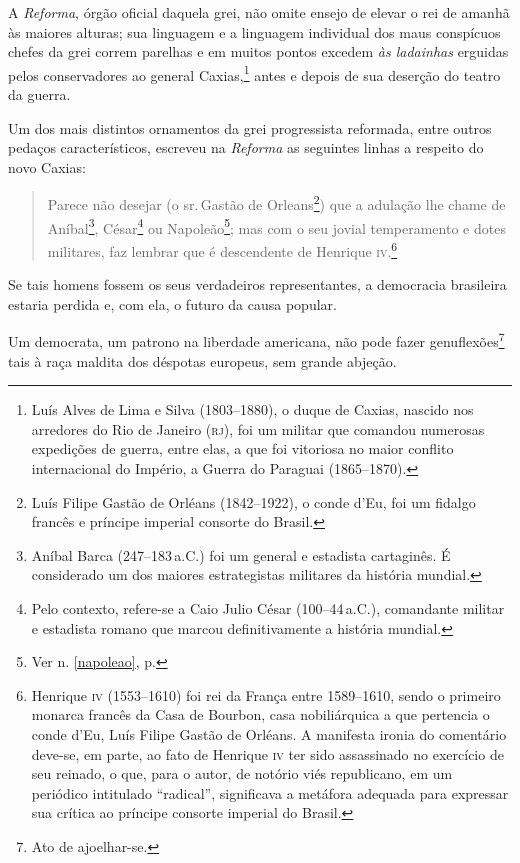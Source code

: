 A \emph{Reforma}, órgão oficial daquela grei, não omite ensejo de elevar
o rei de amanhã às maiores alturas; sua linguagem e a linguagem
individual dos maus conspícuos chefes da grei correm parelhas e em
muitos pontos excedem \emph{às ladainhas} erguidas pelos conservadores
ao general Caxias,\footnote{Luís Alves de Lima e Silva (1803--1880), o
  duque de Caxias, nascido nos arredores do Rio de Janeiro (\textsc{rj}), foi um
  militar que comandou numerosas expedições de guerra, entre elas, a que
  foi vitoriosa no maior conflito internacional do Império, a Guerra do
  Paraguai (1865--1870).} antes e depois de sua deserção do teatro da
guerra.

Um dos mais distintos ornamentos da grei progressista reformada, entre
outros pedaços característicos, escreveu na \emph{Reforma} as seguintes
linhas a respeito do novo Caxias:

\begin{quote}
Parece não desejar (o sr.\,Gastão de Orleans\footnote{Luís Filipe
  Gastão de Orléans (1842--1922), o conde d'Eu, foi um fidalgo francês e
  príncipe imperial consorte do Brasil.}) que a adulação lhe chame de
Aníbal\footnote{Aníbal Barca (247--183\,a.C.) foi um general e estadista
  cartaginês. É considerado um dos maiores estrategistas militares da
  história mundial.}, César\footnote{Pelo contexto, refere-se a Caio
  Julio César (100--44\,a.C.), comandante militar e estadista romano que
  marcou definitivamente a história mundial.} ou Napoleão\footnote{
  Ver n. \ref{napoleao}, p. \pageref{napoleao}}; mas com o seu jovial
temperamento e dotes militares, faz lembrar que é descendente de
Henrique \textsc{iv}.\footnote{Henrique \textsc{iv} (1553--1610) foi rei da França entre
  1589--1610, sendo o primeiro monarca francês da Casa de Bourbon, casa
  nobiliárquica a que pertencia o conde d'Eu, Luís Filipe Gastão de
  Orléans. A manifesta ironia do comentário deve-se, em parte, ao fato
  de Henrique \textsc{iv} ter sido assassinado no exercício de seu reinado, o
  que, para o autor, de notório viés republicano, em um periódico
  intitulado ``radical'', significava a metáfora adequada para expressar
  sua crítica ao príncipe consorte imperial do Brasil.}
\end{quote}  

Se tais homens fossem os seus verdadeiros representantes, a democracia
brasileira estaria perdida e, com ela, o futuro da causa popular.

Um democrata, um patrono na liberdade americana, não pode fazer
genuflexões\footnote{Ato de ajoelhar-se.} tais à raça maldita dos
déspotas europeus, sem grande abjeção.

